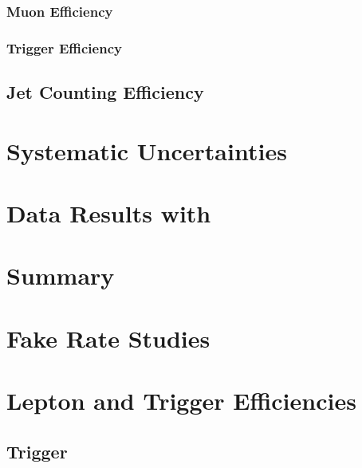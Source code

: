 \documentclass{cmspaper}
\begin{document}
	 \subsubsection{Muon Efficiency}
	 \label{sec:eff_muon}
	 
	 \subsubsection{Trigger Efficiency}
	 \label{sec:eff_trigger}
	 
     \subsection{Jet Counting Efficiency}
     

\section{Systematic Uncertainties}
   \label{sec:systematics}
   

\clearpage
\section{Data Results with \intlumi}
   \label{sec:dataresults}
   

\section{Summary}
     \label{sec:summary}
     

\clearpage


\clearpage 
\appendix
\appendixpage
  \section{Fake Rate Studies}
     \label{app:fake_rate_studies}
     
     
 
\clearpage 
  \section{Lepton and Trigger Efficiencies}
     \label{app:efficiency_studies}
     \subsection{Trigger}
     
\end{document}
